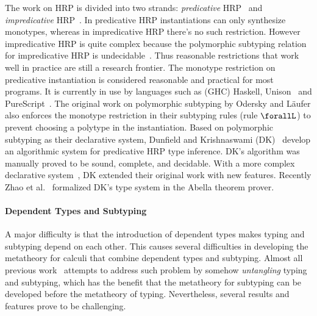 The work on HRP is divided into two strands: \emph{predicative} HRP~\citep{dunfield2013complete,jones2007practical,odersky1996putting,dunfield2019sound}
and \emph{impredicative} HRP~\citep{le2003ml,leijen2008hmf,vytiniotis2008fph,Serrano2018}.
In predicative HRP instantiations can
only synthesize monotypes, whereas in impredicative HRP there's no
such restriction. However impredicative HRP is quite complex because
the polymorphic subtyping relation for impredicative HRP is undecidable~\citep{tiuryn1996subtyping}.
Thus reasonable restrictions that work well in practice are still
a research frontier.
The monotype restriction on predicative instantiation is considered reasonable
and practical for most programs. It is currently in use by languages such as
(GHC) Haskell, Unison~\citep{Unison} and PureScript~\citep{PureScript}.
The original work on polymorphic subtyping by Odersky and L\"aufer also enforces
the monotype restriction in their subtyping rules (rule $\forallL$) to prevent
choosing a polytype in the instantiation. Based on polymorphic subtyping as
their declarative system,
Dunfield and Krishnaswami (DK)~\citep{dunfield2013complete} develop an
algorithmic system for predicative HRP type inference. DK's algorithm was
manually proved to be sound, complete, and decidable.
With a more complex declarative system~\citep{dunfield2019sound}, DK
extended their original work with new features.
Recently Zhao et al.~\citep{zhao19mechanical} formalized DK's type system in the Abella
theorem prover.

\paragraph{Dependent Types and Subtyping}
A major difficulty is that the introduction of dependent
types makes typing and subtyping depend on each other. This causes
several difficulties in developing the metatheory for calculi that
combine dependent types and subtyping. Almost all previous
work~\citep{subdep,ptssub,chen1,cocsub,Chen03coc} attempts to address such problem by somehow
\emph{untangling} typing and subtyping, which has the benefit that the
metatheory for subtyping can be developed before the metatheory of
typing. Nevertheless, several results and features prove to be
challenging.

